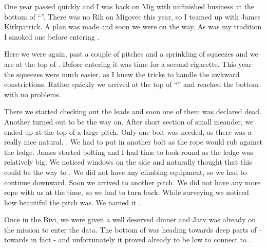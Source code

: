 One year passed quickly and I was back on Mig with unfinished business at the bottom of ``''. There was no Rik on Migovec this year, so I teamed up with James Kirkpatrick. A plan was made and soon we were on the way. As was my tradition I smoked one before entering .

Here we were again, past a couple of pitches and a sprinkling of squeezes and we are at the top of . Before entering  it was time for a second cigarette. This year the squeezes were much easier, as I knew the tricks to handle the
awkward constrictions. Rather quickly we arrived at the top of ``'' and reached the bottom with no problems.

There we started checking out the leads and soon one of them was declared dead. Another turned out to be the way on. After short section of small meander, we ended up at the top of a large pitch. Only one bolt was needed, as there was a really nice natural. . We had to put in another bolt as the rope would rub against the ledge. James started bolting and I had time to look round as
the ledge was relatively big. We noticed windows on the side and naturally thought that this could be the way to . We did not have any climbing equipment, so we had to continue downward. Soon we arrived to another pitch. We did not have any more rope with us at the
time, so we had to turn back. While surveying we noticed how beautiful the pitch was. We named it .

Once in the Bivi, we were given a well deserved dinner and Jarv was
already on the mission to enter the data. The bottom of  was heading towards deep parts of  --
towards  in fact - and unfortunately it proved
already to be low to connect to .



